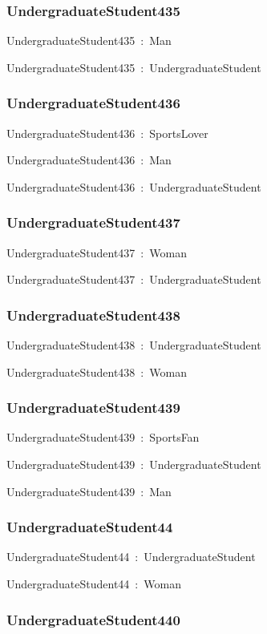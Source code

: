 \documentclass{article}
\begin{document}
\subsubsection*{UndergraduateStudent435}

UndergraduateStudent435~:~Man

UndergraduateStudent435~:~UndergraduateStudent

\subsubsection*{UndergraduateStudent436}

UndergraduateStudent436~:~SportsLover

UndergraduateStudent436~:~Man

UndergraduateStudent436~:~UndergraduateStudent

\subsubsection*{UndergraduateStudent437}

UndergraduateStudent437~:~Woman

UndergraduateStudent437~:~UndergraduateStudent

\subsubsection*{UndergraduateStudent438}

UndergraduateStudent438~:~UndergraduateStudent

UndergraduateStudent438~:~Woman

\subsubsection*{UndergraduateStudent439}

UndergraduateStudent439~:~SportsFan

UndergraduateStudent439~:~UndergraduateStudent

UndergraduateStudent439~:~Man

\subsubsection*{UndergraduateStudent44}

UndergraduateStudent44~:~UndergraduateStudent

UndergraduateStudent44~:~Woman

\subsubsection*{UndergraduateStudent440}
\end{document}
